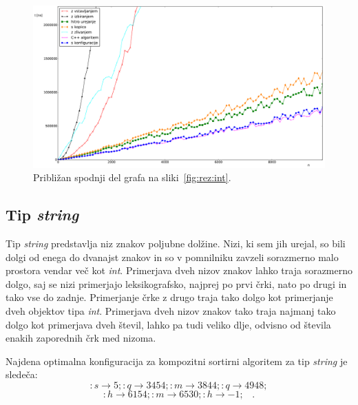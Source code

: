 \documentclass[a4paper,oneside,12pt]{article}
\newcommand{\lra}{\ensuremath{\longrightarrow}}
\newcommand{\edot}{\;\;\;.}
\begin{document}
\begin{figure}[h!]
    \begin{center}
        \includegraphics[width=\textwidth]{slike/int10000zoom.pdf}
    \end{center}
    \vspace{-0.7cm}
    \caption[Rezultati za tip \emph{int}, 10.000 el. -- približano]{Približan
    spodnji del grafa na sliki~\ref{fig:rez:int}.} 
    \label{fig:rez:intblizu}
\end{figure}

\pagebreak
\subsection{Tip \emph{string}}
\label{chapter:rez:string}
Tip \emph{string} predstavlja niz znakov poljubne dolžine. Nizi, ki sem jih urejal, so
bili dolgi od enega do dvanajst znakov in so v pomnilniku zavzeli sorazmerno malo prostora
vendar več kot \emph{int}. Primerjava dveh nizov znakov lahko traja sorazmerno dolgo, saj se
nizi primerjajo leksikografsko, najprej po prvi črki, nato po drugi in tako vse do zadnje.
Primerjanje črke z drugo traja tako dolgo kot primerjanje dveh objektov tipa \emph{int}.
Primerjava dveh nizov znakov tako traja najmanj tako dolgo kot primerjava dveh števil, lahko
pa tudi veliko dlje, odvisno od števila enakih zaporednih črk med nizoma.

Najdena optimalna konfiguracija za kompozitni sortirni algoritem za tip \emph{string} je sledeča:
\[ :s \lra 5;:q \lra 3454;:m \lra 3844;:q \lra 4948; \] 
\[ :h \lra 6154;:m \lra 6530;:h \lra -1; \edot \]
\end{document}
